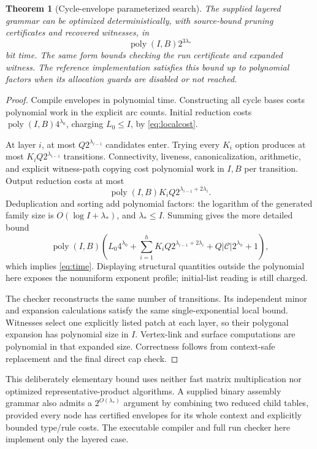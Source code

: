 \documentclass[11pt,a4paper]{article}
\newtheorem{theorem}{Theorem}[section]
\theoremstyle{definition}
\theoremstyle{remark}
\newcommand{\poly}{\operatorname{poly}}
\begin{document}
\begin{theorem}[Cycle-envelope parameterized search]\label{thm:complexity}
The supplied layered grammar can be optimized deterministically, with source-bound
pruning certificates and recovered witnesses, in
\begin{equation}
                            \poly(I,B)2^{3\lambda_*}
 \label{eq:time}
\end{equation}
bit time. The same form bounds checking the run certificate and expanded witness.
The reference implementation satisfies this bound up to polynomial factors when its
allocation guards are disabled or not reached.
\end{theorem}
\begin{proof}
Compile envelopes in polynomial time. Constructing all cycle bases costs polynomial work
in the explicit arc counts. Initial reduction costs $\poly(I,B)4^{\lambda_0}$, charging
$L_0\le I$, by \eqref{eq:localcost}.

At layer $i$, at most $Q2^{\lambda_{i-1}}$ candidates enter. Trying every $K_i$ option
produces at most $K_iQ2^{\lambda_{i-1}}$ transitions. Connectivity, liveness,
canonicalization, arithmetic, and explicit witness-path copying cost polynomial work in
$I,B$ per transition. Output reduction costs at most
\[
                    \poly(I,B)K_iQ2^{\lambda_{i-1}+2\lambda_i}.
\]
Deduplication and sorting add polynomial factors: the logarithm of the generated family
size is $O(\log I+\lambda_*)$, and $\lambda_*\le I$. Summing gives the more detailed
bound
\begin{equation}
 \poly(I,B)\left(L_0 4^{\lambda_0}
       +\sum_{i=1}^{h}K_iQ2^{\lambda_{i-1}+2\lambda_i}
       +Q|\mathcal C|2^{\lambda_h}+1\right),
 \label{eq:nonuniform}
\end{equation}
which implies \eqref{eq:time}. Displaying structural quantities outside the polynomial
here exposes the nonuniform exponent profile; initial-list reading is still charged.

The checker reconstructs the same number of transitions. Its independent minor and
expansion calculations satisfy the same single-exponential local bound. Witnesses select
one explicitly listed patch at each layer, so their polygonal expansion has polynomial
size in $I$. Vertex-link and surface computations are polynomial in that expanded size.
Correctness follows from context-safe replacement and the final direct cap check.
\end{proof}

This deliberately elementary bound uses neither fast matrix multiplication nor optimized
representative-product algorithms. A supplied binary assembly grammar also admits a
$2^{O(\lambda_*)}$ argument by combining two reduced child tables, provided every node
has certified envelopes for its whole context and explicitly bounded type/rule costs.
The executable compiler and full run checker here implement only the layered case.
\end{document}
